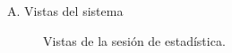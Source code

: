 \begin{annexes}{A. Vistas del sistema}
\begin{figure}[!ht]
        \caption{Vistas de la sesión de estadística.}
        \label{annex: 5}
    \end{figure}


\end{annexes}
